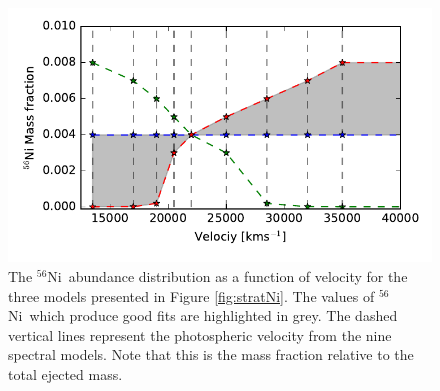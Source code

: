 \documentclass[fleqn,usenatbib]{mnras}
\newcommand{\Nifs}{$^{56}$Ni}
\begin{document}
\begin{figure}
\centering
\includegraphics[scale=0.6]{plots/Niabundances_mainpaper.pdf}
\caption{ The \Nifs\ abundance distribution as a function of velocity for the three models presented in Figure \ref{fig:stratNi}. The values of \Nifs\ which produce good fits are highlighted in grey. The dashed vertical lines represent the photospheric velocity from the nine spectral models. Note that this is the mass fraction relative to the total ejected mass.}
\label{fig:stratNiab}
\end{figure}
\end{document}
